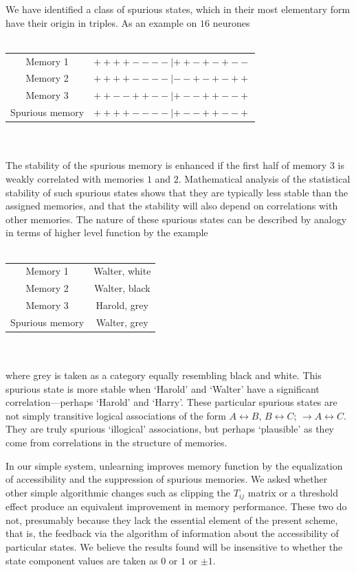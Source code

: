 \documentclass[11pt,letterpaper]{article}
\begin{document}
	We have identified a class of spurious states, which in their most elementary form have their origin in triples. As an example on $16$ neurones
	\\
	\\
	\begin{tabular}{cc}
		Memory 1 & $++++----|++-+-+--$ \\ 
		Memory 2 & $++++----|--+-+-++$ \\ 
		Memory 3 & $++--++--|+--++--+$ \\ 
		Spurious memory & $++++----|+--++--+$ \\ 
	\end{tabular}
	\\
	\\
	The stability of the spurious memory is enhanced if the first half of memory $3$ is weakly correlated with memories $1$ and $2$. Mathematical analysis of the statistical stability of such spurious states shows that they are typically less stable than the assigned memories, and that the stability will also depend on correlations with other memories. The nature of these spurious states can be described by analogy in terms of higher level function by the example
	\\
	\\
	\begin{tabular}{cc}
		Memory 1 & Walter, white \\ 
		Memory 2 & Walter, black \\ 
		Memory 3 & Harold, grey \\ 
		Spurious memory & Walter, grey \\ 
	\end{tabular}
	\\
	\\
	where grey is taken as a category equally resembling black and white. This spurious state is more stable when `Harold' and `Walter' have a significant correlation---perhaps `Harold' and `Harry'. These particular spurious states are not simply transitive logical associations of the form $A\leftrightarrow B$, $B\leftrightarrow C$; $\rightarrow A\leftrightarrow C$. They are truly spurious `illogical' associations, but perhaps `plausible' as they come from correlations in the structure of memories.
	
	In our simple system, unlearning improves memory function by the equalization of accessibility and the suppression of spurious memories. We asked whether other simple algorithmic changes such as clipping the $T_{ij}$ matrix or a threshold effect produce an equivalent improvement in memory performance. These two do not, presumably because they lack the essential element of the present scheme, that is, the feedback via the algorithm of information about the accessibility of particular states. We believe the results found will be insensitive to whether the state component values are taken as $0$ or $1$ or $\pm 1$.
	
\end{document}
